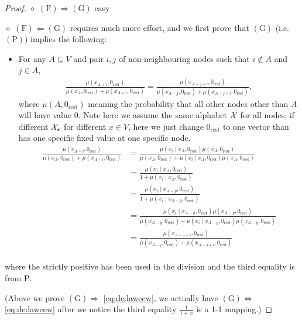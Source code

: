 \documentclass{article}
\begin{document}
\begin{proof}
$\diamond$  $(\mathrm{F}) \Rightarrow(\mathrm{G})$ easy

$\diamond$ $(\mathrm{F}) \Leftarrow(\mathrm{G})$ requires much more effort, and we first prove that  $(\mathrm{G})$ (i.e. $(\mathrm{P})$) implies the following:
\begin{itemize}
    \item For any  $A \subseteq V$ and pair $i, j$ of non-neighbouring nodes such that $i \notin A$ and $j \in A$,
\begin{align}
\frac{\mu(x_{A+i},0_{\mathrm{rest}})}{\mu(x_A,0_{\mathrm{rest}})+\mu(x_{A+i},0_{\mathrm{rest}})}=\frac{\mu(x_{A- j+i},0_{\mathrm{rest}})}{\mu(x_{A-j},0_{\mathrm{rest}})+\mu(x_{A-j+i},0_{\mathrm{rest}})}, \label{eq:dcdaweew}
\end{align}
where $\mu(A,0_{\mathrm{rest}})$ meaning the probability that all other nodes other than $A$ will have value $0$. Note here we assume the same alphabet $\mathcal{X}$ for all nodes, if different $\mathcal{X}_s$ for different $x\in V$, here we just change $0_{\mathrm{rest}}$ to one  vector than has one specific fixed value at one specific node.
\begin{align*}
\frac{\mu(x_{A+i},0_{\mathrm{rest}})}{\mu(x_A,0_{\mathrm{rest}})+\mu(x_{A+i},0_{\mathrm{rest}})} & = \frac{\mu(x_i \mid x_A, 0_{\mathrm{rest}})\mu(x_A, 0_{\mathrm{rest}}) }{\mu(x_A,0_{\mathrm{rest}})+\mu(x_i \mid x_A, 0_{\mathrm{rest}})\mu(x_A, 0_{\mathrm{rest}}) } \\
& = \frac{\mu(x_i \mid x_A, 0_{\mathrm{rest}}) }{1+\mu(x_i \mid x_A, 0_{\mathrm{rest}})}\\
& = \frac{\mu(x_i \mid x_{A-y}, 0_{\mathrm{rest}}) }{1+\mu(x_i \mid x_{A-y}, 0_{\mathrm{rest}})}\\
& = \frac{\mu(x_i \mid x_{A-y}, 0_{\mathrm{rest}})\mu(x_{A-y}, 0_{\mathrm{rest}}) }{\mu(x_{A-y}, 0_{\mathrm{rest}})+\mu(x_i \mid x_{A-y}, 0_{\mathrm{rest}})\mu(x_{A-y}, 0_{\mathrm{rest}})}\\
& = \frac{\mu(x_{A- j+i},0_{\mathrm{rest}})}{\mu(x_{A-j},0_{\mathrm{rest}})+\mu(x_{A-j+i},0_{\mathrm{rest}})}\\
\end{align*}
\end{itemize}
where the strictly positive has been used in the division and the third equality is from $\mathrm{P}$.

(Above we prove $(\mathrm{G})\Rightarrow$ \cref{eq:dcdaweew}, we actually have $(\mathrm{G})\Leftrightarrow$ \cref{eq:dcdaweew} after we notice the third equality $\frac{1}{1+x}$ is a 1-1 mapping.)


\end{proof}
\end{document}
